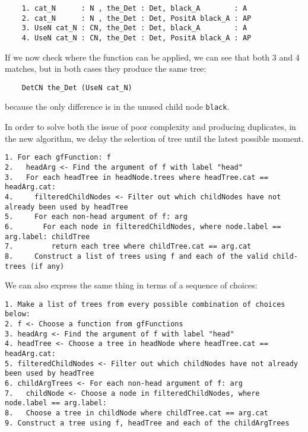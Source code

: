 \begin{verbatim}
    1. cat_N      : N , the_Det : Det, black_A        : A
    2. cat_N      : N , the_Det : Det, PositA black_A : AP
    3. UseN cat_N : CN, the_Det : Det, black_A        : A
    4. UseN cat_N : CN, the_Det : Det, PositA black_A : AP
\end{verbatim}

If we now check where the function can be applied, we can see that both 3 and 4 matches,
but in both cases they produce the same tree:
\begin{verbatim}
    DetCN the_Det (UseN cat_N)
\end{verbatim}
because the only difference is in the unused child node \verb|black|.

In order to solve both the issue of poor complexity and producing duplicates, in the new algorithm, we delay the selection of tree until the latest possible moment.




\begin{verbatim}
1. For each gfFunction: f
2.   headArg <- Find the argument of f with label "head"
3.   For each headTree in headNode.trees where headTree.cat == headArg.cat:
4.     filteredChildNodes <- Filter out which childNodes have not already been used by headTree
5.     For each non-head argument of f: arg
6.       For each node in filteredChildNodes, where node.label == arg.label: childTree
7.         return each tree where childTree.cat == arg.cat
8.     Construct a list of trees using f and each of the valid child-trees (if any)
\end{verbatim}

We can also express the same thing in terms of a sequence of choices:

\begin{verbatim}
1. Make a list of trees from every possible combination of choices below:
2. f <- Choose a function from gfFunctions
3. headArg <- Find the argument of f with label "head"
4. headTree <- Choose a tree in headNode where headTree.cat == headArg.cat:
5. filteredChildNodes <- Filter out which childNodes have not already been used by headTree
6. childArgTrees <- For each non-head argument of f: arg
7.   childNode <- Choose a node in filteredChildNodes, where node.label == arg.label:
8.   Choose a tree in childNode where childTree.cat == arg.cat
9. Construct a tree using f, headTree and each of the childArgTrees
\end{verbatim}


